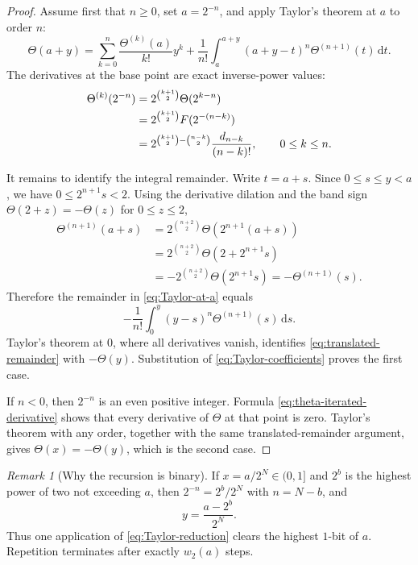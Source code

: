\documentclass[11pt,oneside]{article}
\theoremstyle{definition}
\theoremstyle{remark}
\newtheorem{remark}[theorem]{Remark}
\newcommand{\wt}{w_2}
\newcommand{\dd}{\,\mathrm d}
\newcommand{\Thetaf}{\Theta}
\begin{document}
\begin{proof}
Assume first that $n\ge0$, set $a=2^{-n}$, and apply Taylor's theorem at $a$ to
order $n$:
\begin{equation}\label{eq:Taylor-at-a}
 \Thetaf(a+y)=\sum_{k=0}^n\frac{\Thetaf^{(k)}(a)}{k!}y^k
 +\frac1{n!}\int_a^{a+y}(a+y-t)^n\Thetaf^{(n+1)}(t)\dd t.
\end{equation}
The derivatives at the base point are exact inverse-power values:
\begin{align}
 \Thetaf^{(k)}(2^{-n})
 &=2^{\binom{k+1}{2}}\Thetaf(2^{k-n})\notag\\
 &=2^{\binom{k+1}{2}}
   F(2^{-(n-k)})\notag\\
 &=2^{\binom{k+1}{2}-\binom{n-k}{2}}
   \frac{d_{n-k}}{(n-k)!},
 \qquad 0\le k\le n.\label{eq:Taylor-coefficients}
\end{align}

It remains to identify the integral remainder.  Write $t=a+s$.  Since
$0\le s\le y<a$, we have $0\le2^{n+1}s<2$.  Using the derivative dilation and the
band sign $\Thetaf(2+z)=-\Thetaf(z)$ for $0\le z\le2$,
\begin{align*}
 \Thetaf^{(n+1)}(a+s)
 &=2^{\binom{n+2}{2}}\Thetaf(2^{n+1}(a+s))\\
 &=2^{\binom{n+2}{2}}\Thetaf(2+2^{n+1}s)\\
 &=-2^{\binom{n+2}{2}}\Thetaf(2^{n+1}s)
 =-\Thetaf^{(n+1)}(s).
\end{align*}
Therefore the remainder in \eqref{eq:Taylor-at-a} equals
\begin{equation}\label{eq:translated-remainder}
 -\frac1{n!}\int_0^y(y-s)^n\Thetaf^{(n+1)}(s)\dd s.
\end{equation}
Taylor's theorem at $0$, where all derivatives vanish, identifies
\eqref{eq:translated-remainder} with $-\Thetaf(y)$.  Substitution of
\eqref{eq:Taylor-coefficients} proves the first case.

If $n<0$, then $2^{-n}$ is an even positive integer.  Formula
\eqref{eq:theta-iterated-derivative} shows that every derivative of $\Thetaf$ at
that point is zero.  Taylor's theorem with any order, together with the same
translated-remainder argument, gives $\Thetaf(x)=-\Thetaf(y)$, which is the second
case.
\end{proof}

\begin{remark}[Why the recursion is binary]
If $x=a/2^N\in(0,1]$ and $2^b$ is the highest power of two not exceeding $a$,
then $2^{-n}=2^b/2^N$ with $n=N-b$, and
\[
  y=\frac{a-2^b}{2^N}.
\]
Thus one application of \eqref{eq:Taylor-reduction} clears the highest $1$-bit of
$a$.  Repetition terminates after exactly $\wt(a)$ steps.
\end{remark}
\end{document}
